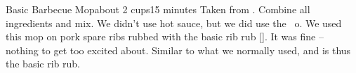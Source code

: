 
\begin{recipe}{Basic Barbecue Mop}{about 2 cups}{15 minutes}
\freeform Taken from \emph{}.
Combine all ingredients and mix.
\freeform We didn't use hot sauce, but we did use the ~o.  We used this mop on pork spare ribs rubbed with the basic rib rub \ref{}.  It was fine -- nothing to get too excited about.  Similar to what we normally used, and is thus the basic rib rub.
\end{recipe}
